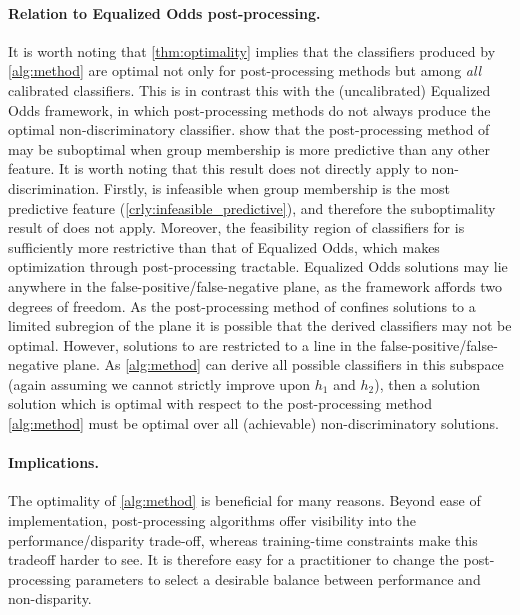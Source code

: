 \paragraph{Relation to Equalized Odds post-processing.}
It is worth noting that \autoref{thm:optimality} implies that
the classifiers produced by \autoref{alg:method} are optimal not
only for post-processing methods but among \emph{all}
calibrated classifiers.
%
This is in contrast this with the (uncalibrated) Equalized Odds
framework, in which post-processing methods do not always produce
the optimal non-discriminatory classifier.
\citet{woodworth2017learning} show that the post-processing method
of \citet{hardt2016equality} may be suboptimal when group membership
is more predictive than any other feature.
It is worth noting that this result does not directly apply to
\methodname{} non-discrimination.
Firstly, \methodname{} is infeasible when group membership is the
most predictive feature (\autoref{crly:infeasible_predictive}), and
therefore the suboptimality result of \cite{woodworth2017learning} does
not apply.
Moreover, the feasibility region of classifiers for \methodname{}
is sufficiently more restrictive than that of Equalized Odds, which
makes optimization through post-processing tractable.
Equalized Odds solutions may lie anywhere in the false-positive/false-negative
plane, as the framework affords two degrees of freedom. As the post-processing
method of \cite{hardt2016equality} confines solutions to a limited subregion of the
plane it is possible that the derived classifiers may not be optimal. However,
solutions to \methodname{} are restricted to a line in the false-positive/false-negative
plane. As \autoref{alg:method} can derive all possible classifiers in this subspace
(again assuming we cannot strictly improve upon $h_1$ and $h_2$), then a solution
solution which is optimal with respect to the post-processing method \autoref{alg:method}
must be optimal over all (achievable) non-discriminatory solutions.

\paragraph{Implications.}
The optimality of \autoref{alg:method} is beneficial for many reasons.
Beyond ease of implementation, post-processing algorithms offer visibility into
the performance/disparity trade-off, whereas training-time constraints make
this tradeoff harder to see. It is therefore easy for a practitioner to change
the post-processing parameters to select a desirable balance between
performance and non-disparity. 

